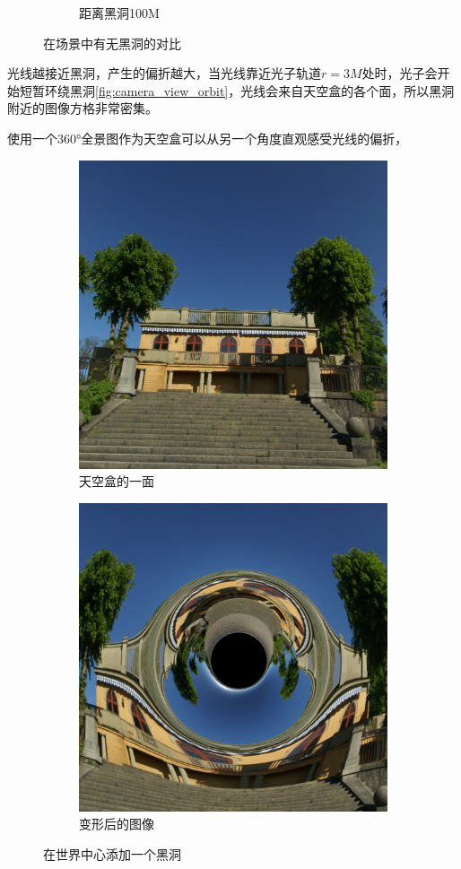 \begin{figure}[H]
\begin{subfigure}{.5\textwidth}
        \caption{距离黑洞100M}
        \label{fig:blackhole-chessboard} %
    \end{subfigure}
    \caption{在场景中有无黑洞的对比}
\end{figure}

光线越接近黑洞，产生的偏折越大，当光线靠近光子轨道$r=3M$处时，光子会开始短暂环绕黑洞\ref{fig:camera_view_orbit}，光线会来自天空盒的各个面，所以黑洞附近的图像方格非常密集。

使用一个\ang{360}全景图作为天空盒可以从另一个角度直观感受光线的偏折，
\begin{figure}[H]
    \centering
    \begin{subfigure}{.5\textwidth}
        \centering
        \includegraphics[width=.8\linewidth]{images/building.png}
        \caption{天空盒的一面}
        \label{fig:building}
    \end{subfigure}%
    \begin{subfigure}{.5\textwidth}
        \centering
        \includegraphics[width=.8\linewidth]{images/building_distort.png}
        \caption{变形后的图像}
        \label{fig:building_distort}
    \end{subfigure}
    \caption{在世界中心添加一个黑洞}
\end{figure}
